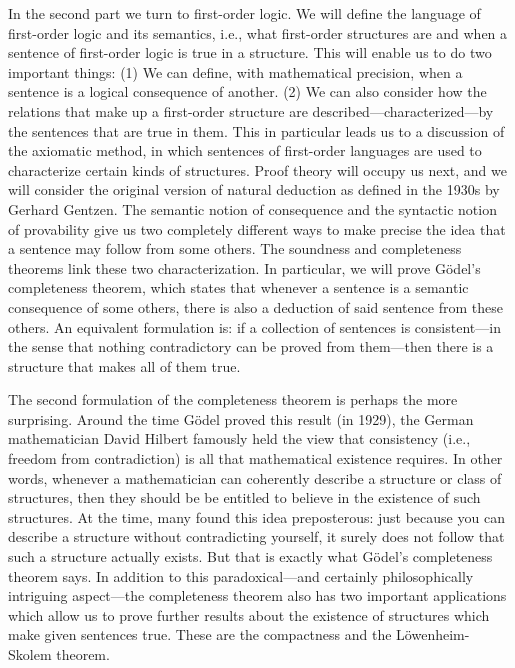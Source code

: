 In the second part we turn to first-order logic.  We will define the
language of first-order logic and its semantics, i.e., what first-order
structures are and when a sentence of first-order logic is true in a
structure.  This will enable us to do two important things: (1) We can
define, with mathematical precision, when a sentence is a logical
consequence of another.  (2) We can also consider how the relations
that make up a first-order structure are
described---characterized---by the sentences that are true in them.
This in particular leads us to a discussion of the axiomatic method,
in which sentences of first-order languages are used to characterize
certain kinds of structures.  Proof theory will occupy us next, and we
will consider the original version of natural deduction as defined in
the 1930s by Gerhard Gentzen.  The semantic notion of consequence and
the syntactic notion of provability give us two completely different
ways to make precise the idea that a sentence may follow from some
others. The soundness and completeness theorems link these two
characterization. In particular, we will prove G\"odel's completeness
theorem, which states that whenever a sentence is a semantic
consequence of some others, there is also a deduction of said sentence
from these others.  An equivalent formulation is: if a collection of
sentences is consistent---in the sense that nothing contradictory can
be proved from them---then there is a structure that makes all of them
true.

The second formulation of the completeness theorem is perhaps the more
surprising. Around the time G\"odel proved this result (in 1929), the
German mathematician David Hilbert famously held the view that
consistency (i.e., freedom from contradiction) is all that mathematical
existence requires.  In other words, whenever a mathematician can
coherently describe a structure or class of structures, then they
should be be entitled to believe in the existence of such structures.
At the time, many found this idea preposterous: just because you can
describe a structure without contradicting yourself, it surely does
not follow that such a structure actually exists.  But that is exactly
what G\"odel's completeness theorem says.  In addition to this
paradoxical---and certainly philosophically intriguing aspect---the
completeness theorem also has two important applications which allow
us to prove further results about the existence of structures which
make given sentences true.  These are the compactness and the
L\"owenheim-Skolem theorem.

